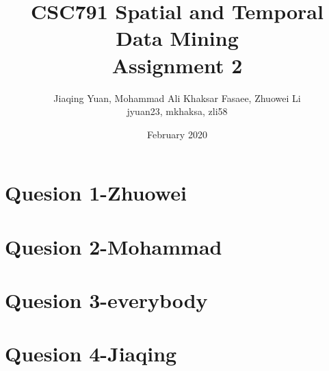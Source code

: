 \documentclass{article}
\title{CSC791 Spatial and Temporal Data Mining\\ Assignment 2}
\author{Jiaqing Yuan, Mohammad Ali Khaksar Fasaee, Zhuowei Li\\ jyuan23, mkhaksa, zli58}
\date{February 2020}
\begin{document}
\maketitle

\section{Quesion 1-Zhuowei}  

\newpage
\section{Quesion 2-Mohammad}

\newpage
\section{Quesion 3-everybody}

\newpage
\section{Quesion 4-Jiaqing}


\newpage


\end{document}
